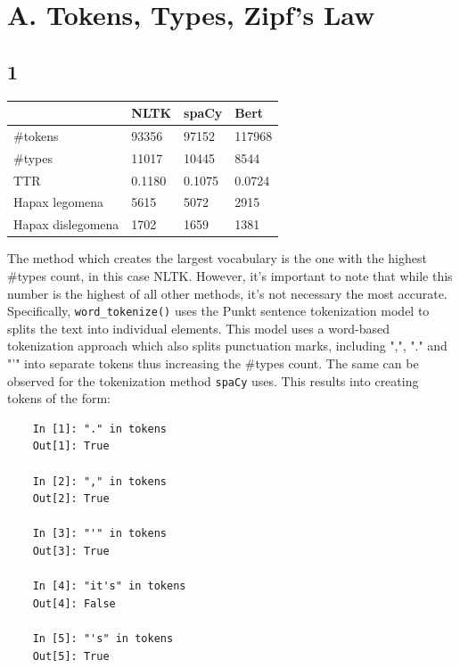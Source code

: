 \documentclass[8pt,a4paper]{report}%
\newcommand\blankpage{%
    \null
    \thispagestyle{empty}%
    \addtocounter{page}{-1}%
    \newpage}
\begin{document}

\section*{Α. Tokens, Types, Zipf’s Law}

\subsection*{1}

\begin{table}[H]
\begin{tabular}{|l|l|l|l|}
\hline
                  &  NLTK & spaCy & Bert   \\ \hline
\#tokens          & 93356 & 97152 & 117968 \\ \hline
\#types           & 11017 & 10445 & 8544   \\ \hline
TTR               & 0.1180& 0.1075& 0.0724 \\ \hline
Hapax legomena    & 5615  & 5072  & 2915   \\ \hline
Hapax dislegomena & 1702  & 1659  & 1381   \\ \hline
\end{tabular}
\end{table}

The method which creates the largest vocabulary is the one with the highest \#types count, in this case NLTK. However, it's important to note that while this number is the highest of all other methods, it's not necessary the most accurate. Specifically, \lstinline{word_tokenize()} uses the Punkt sentence tokenization model to splits the text into individual elements. This model uses a word-based tokenization approach which also splits punctuation marks, including ",", "." and "'" into separate tokens thus increasing the \#types count. The same can be observed for the tokenization method \lstinline{spaCy} uses. This results into creating tokens of the form:

\begin{lstlisting}
    In [1]: "." in tokens
    Out[1]: True

    In [2]: "," in tokens
    Out[2]: True

    In [3]: "'" in tokens
    Out[3]: True

    In [4]: "it's" in tokens
    Out[4]: False

    In [5]: "'s" in tokens
    Out[5]: True
\end{lstlisting}
\end{document}
